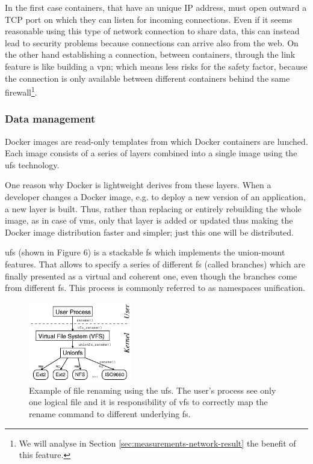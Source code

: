 In the first case containers, that have an unique IP address, must open outward a TCP port on which they can
listen for incoming connections. Even if it seems reasonable using this type of network connection to share
data, this can instead lead to security problems because connections can arrive also from the web. On the other
hand establishing a connection, between containers, through the link feature is like building a \ac{vpn};
which means less risks for the safety factor, because the connection is only available between different
containers behind the same firewall\footnote{We will analyse in Section \ref{sec:measurements-network-result}
the benefit of this feature.}.

\subsubsection{Data management}
\label{sec:background-deployments-docker-dataManagement}
Docker images are read-only templates from which Docker containers are lunched. Each image consists of
a series of layers combined into a single image using the \acf{ufs} technology.

One reason why Docker is lightweight derives from these layers. When a developer changes a Docker image,
e.g. to deploy a new version of an application, a new layer is built. Thus, rather than replacing
or entirely rebuilding the whole image, as in case of \ac{vm}s, only that layer is added or updated thus
making the Docker image distribution faster and simpler; just this one will be distributed.

\ac{ufs} (shown in Figure 6) is a stackable \ac{fs} which implements the union-mount features. That allows
to specify a series of different \ac{fs} (called branches) which are finally presented as a virtual
and coherent one, even though the branches come from different \ac{fs}. This process is commonly
referred to as namespaces unification.

\begin{figure}
	\centering{}
	\includegraphics[width=0.4\textwidth]{chapters/background/images/unionfs.png}
	\caption[Docker \ac{ufs} overview]{Example of file renaming using the \acf{ufs}. The user's process
		see only one logical file and it is responsibility of \acf{vfs} to correctly map the rename command
		to different underlying \acf{fs}.}
	\label{img:background-deployments-docker-architecture-unionfs}
\end{figure}

